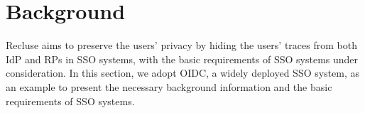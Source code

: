 \section{Background}
\label{sec:background}
Recluse aims to preserve the users' privacy by hiding the users' traces from both IdP and RPs in SSO systems, 
with the basic requirements of SSO systems under consideration. 
In this section, we adopt OIDC, a widely deployed SSO system, as an example to present the necessary background information  and the basic requirements of SSO systems.




